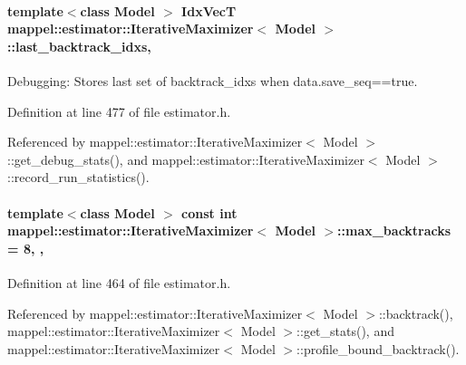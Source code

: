 \paragraph[{\texorpdfstring{last\+\_\+backtrack\+\_\+idxs}{last_backtrack_idxs}}]{\setlength{\rightskip}{0pt plus 5cm}template$<$class Model $>$ {\bf Idx\+VecT} {\bf mappel\+::estimator\+::\+Iterative\+Maximizer}$<$ Model $>$\+::last\+\_\+backtrack\+\_\+idxs\hspace{0.3cm}{\ttfamily [protected]}, {\ttfamily [inherited]}}\hypertarget{classmappel_1_1estimator_1_1IterativeMaximizer_aae10373b4dc244c435059bbc6b0d9704}{}\label{classmappel_1_1estimator_1_1IterativeMaximizer_aae10373b4dc244c435059bbc6b0d9704}


Debugging\+: Stores last set of backtrack\+\_\+idxs when data.\+save\+\_\+seq==true. 



Definition at line 477 of file estimator.\+h.



Referenced by mappel\+::estimator\+::\+Iterative\+Maximizer$<$ Model $>$\+::get\+\_\+debug\+\_\+stats(), and mappel\+::estimator\+::\+Iterative\+Maximizer$<$ Model $>$\+::record\+\_\+run\+\_\+statistics().

\paragraph[{\texorpdfstring{max\+\_\+backtracks}{max_backtracks}}]{\setlength{\rightskip}{0pt plus 5cm}template$<$class Model $>$ const int {\bf mappel\+::estimator\+::\+Iterative\+Maximizer}$<$ Model $>$\+::max\+\_\+backtracks = 8\hspace{0.3cm}{\ttfamily [static]}, {\ttfamily [protected]}, {\ttfamily [inherited]}}\hypertarget{classmappel_1_1estimator_1_1IterativeMaximizer_ac26f7b7965a26fa21f07732c3b1d727e}{}\label{classmappel_1_1estimator_1_1IterativeMaximizer_ac26f7b7965a26fa21f07732c3b1d727e}


Definition at line 464 of file estimator.\+h.



Referenced by mappel\+::estimator\+::\+Iterative\+Maximizer$<$ Model $>$\+::backtrack(), mappel\+::estimator\+::\+Iterative\+Maximizer$<$ Model $>$\+::get\+\_\+stats(), and mappel\+::estimator\+::\+Iterative\+Maximizer$<$ Model $>$\+::profile\+\_\+bound\+\_\+backtrack().

